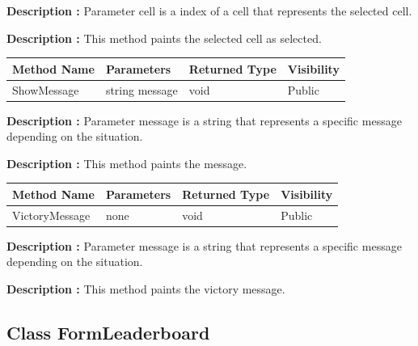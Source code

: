 \documentclass[12pt]{article}
\begin{document}
\textbf{Description :} Parameter cell is a index of a cell that represents the selected cell.

\textbf{Description :} This method paints the selected cell as selected.

\begin{table}[H]
    \begin{tabular}{|l|l|l|l|}
    \hline
    \rowcolor[HTML]{EFEFEF} 
    \cellcolor[HTML]{EFEFEF}\textbf{Method Name} & \textbf{Parameters}                    & \textbf{Returned Type} & \textbf{Visibility} \\ \hline
    ShowMessage                                    & string message                       & void                   & Public             \\ \hline
    \end{tabular}
\end{table}

\textbf{Description :} Parameter message is a string that represents a specific message depending on the situation.

\textbf{Description :} This method paints the message.

\begin{table}[H]
    \begin{tabular}{|l|l|l|l|}
    \hline
    \rowcolor[HTML]{EFEFEF} 
    \cellcolor[HTML]{EFEFEF}\textbf{Method Name} & \textbf{Parameters}                    & \textbf{Returned Type} & \textbf{Visibility} \\ \hline
    VictoryMessage                               & none                                   & void                   & Public             \\ \hline
    \end{tabular}
\end{table}

\textbf{Description :} Parameter message is a string that represents a specific message depending on the situation.

\textbf{Description :} This method paints the victory message.

\newpage


\subsection{Class FormLeaderboard}
\end{document}
